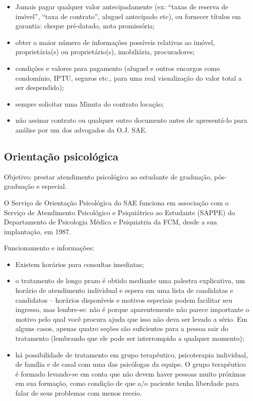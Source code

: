 \begin{itemize}
\item Jamais pagar qualquer valor antecipadamente (ex: ``taxas de reserva de
  imóvel'', ``taxa de contrato'', aluguel antecipado etc), ou fornecer títulos
  em garantia: cheque pré-datado, nota promissória;

\item obter o maior número de informações possíveis relativas ao imóvel,
  proprietária(s) ou proprietário(s), imobiliária, procuradores;

\item condições e valores para pagamento (aluguel e outros encargos como
  condomínio, IPTU, seguros etc., para uma real visualização do valor total a
  ser despendido);

\item sempre solicitar uma Minuta do contrato locação;

\item não assinar contrato ou qualquer outro documen\-to antes de apresentá-lo
  para análise por um dos advogados da O.J. SAE.
\end{itemize}

\subsection{Orientação psicológica}

Objetivo: prestar atendimento psicológico ao estudante de graduação,
pós-graduação e especial.

O Serviço de Orientação Psicológica do SAE funciona em associação com o Serviço
de Atendimento Psicológico e Psiquiátrico ao Estudante (SAPPE) do Departamento
de Psicologia Médica e Psiquiatria da FCM, desde a sua implantação, em 1987.

Funcionamento e informações:

\begin{itemize}
\item Existem horários para consultas imediatas; %

\item o tratamento de longo prazo é obtido mediante uma palestra explicativa,
  um horário de atendimento individual e espera em uma lista de candidatas e
  candidatos -- horários disponíveis e motivos especiais podem facilitar seu
  ingresso, mas lembre-se: não é porque aparentemente não parece importante o
  motivo pelo qual você procura ajuda que isso não deva ser levado a sério. Em
  alguns casos, apenas quatro seções são suficientes para a pessoa sair do
  tratamento (lembrando que ele pode ser interrompido a qualquer momento);

\item há possibilidade de tratamento em grupo terapêutico, psicoterapia
  individual, de família e de casal com uma das psicólogas da equipe. O grupo
  terapêutico é formado levando-se em conta que não devem haver pessoas muito
  próximas em sua formação, como condição de que a/o paciente tenha liberdade
  para falar de seus problemas com menos receio.
\end{itemize}

